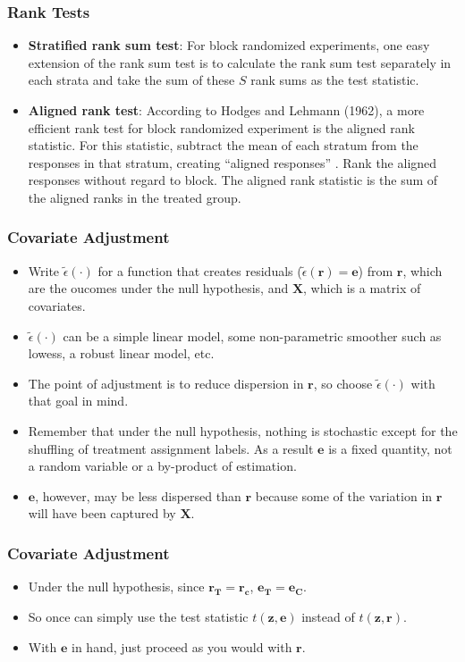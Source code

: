 \documentclass{beamer}
\begin{document}
\begin{frame}[t]\frametitle{Rank Tests}
	\begin{itemize}
		\item<+-> \textbf{Stratified rank sum test}: For block randomized experiments, one easy extension of the rank sum test is to calculate the rank sum test separately in each strata and take the sum of these $S$ rank sums as the test statistic. 
		\item<+->\textbf{ Aligned rank test}: According to Hodges and Lehmann (1962), a more efficient rank test for block randomized experiment is the aligned rank statistic. For this statistic, subtract the mean of each stratum from the responses in that stratum, creating ``aligned responses'' . Rank the aligned responses without regard to block. The aligned rank statistic is the sum of the aligned ranks in the treated group.
		
	\end{itemize}
	
\end{frame}


\begin{frame}[t]\frametitle{Covariate Adjustment}
	\begin{itemize}
		\item<+-> Write $\tilde \epsilon(\cdot)$ for a function that creates residuals  ($\tilde \epsilon(\mathbf{r})=\mathbf{e}$)  from $\mathbf r$, which are the oucomes under the null hypothesis, and $\mathbf{X}$, which is a matrix of covariates.
		\item<+-> $\tilde \epsilon(\cdot)$ can be a simple linear model, some non-parametric
		smoother such as lowess, a robust linear model, etc.
		\item<+->  The point of adjustment is to reduce dispersion in $\mathbf{r}$, so choose  $\tilde \epsilon(\cdot)$  with that goal in mind.
		\item<+-> Remember that under the null hypothesis, nothing is stochastic except
		for the shuffling of treatment assignment labels. As a result
		$\mathbf{e}$ is a fixed quantity, not a random variable or a
		by-product of estimation.
		\item<+-> $\mathbf{e}$, however, may be less dispersed
		than $\mathbf{r}$ because some of the variation in $\mathbf{r}$ will
		have been captured by $\mathbf{X}$. 
	\end{itemize}	
\end{frame}

\begin{frame}[c]\frametitle{Covariate Adjustment}
	\begin{itemize}
		\item<+-> Under the null hypothesis, since $\mathbf{r_T}=\mathbf{r_c}$,
		$\mathbf{e_T}=\mathbf{e_C}$.
		\item<+-> So once can simply use the test
		statistic $t(\mathbf{z},\mathbf{e})$ instead of
		$t(\mathbf{z},\mathbf{r})$.
		\item<+-> With $\mathbf{e}$ in hand, just proceed as
		you would with $\mathbf{r}$.
	\end{itemize}
\end{frame}
\end{document}
